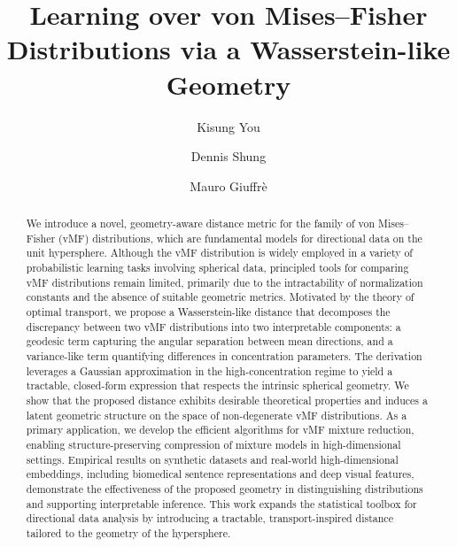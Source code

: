 \documentclass[10pt]{article}
\begin{document}
	
\title{Learning over von Mises–Fisher Distributions via a Wasserstein-like Geometry}
\author[1,2]{Kisung You}
\author[2]{Dennis Shung}
\author[2]{Mauro Giuffr\`{e}}
\date{}

\maketitle
\begin{abstract}
We introduce a novel, geometry-aware distance metric for the family of von Mises–Fisher (vMF) distributions, which are fundamental models for directional data on the unit hypersphere. Although the vMF distribution is widely employed in a variety of probabilistic learning tasks involving spherical data, principled tools for comparing vMF distributions remain limited, primarily due to the intractability of normalization constants and the absence of suitable geometric metrics. Motivated by the theory of optimal transport, we propose a Wasserstein-like distance that decomposes the discrepancy between two vMF distributions into two interpretable components: a geodesic term capturing the angular separation between mean directions, and a variance-like term quantifying differences in concentration parameters. The derivation leverages a Gaussian approximation in the high-concentration regime to yield a tractable, closed-form expression that respects the intrinsic spherical geometry. We show that the proposed distance exhibits desirable theoretical properties and induces a latent geometric structure on the space of non-degenerate vMF distributions. As a primary application, we develop the efficient algorithms for vMF mixture reduction, enabling structure-preserving compression of mixture models in high-dimensional settings. Empirical results on synthetic datasets and real-world high-dimensional embeddings, including biomedical sentence representations and deep visual features, demonstrate the effectiveness of the proposed geometry in distinguishing distributions and supporting interpretable inference. This work expands the statistical toolbox for directional data analysis by introducing a tractable, transport-inspired distance tailored to the geometry of the hypersphere.
\end{abstract}

\end{document}
